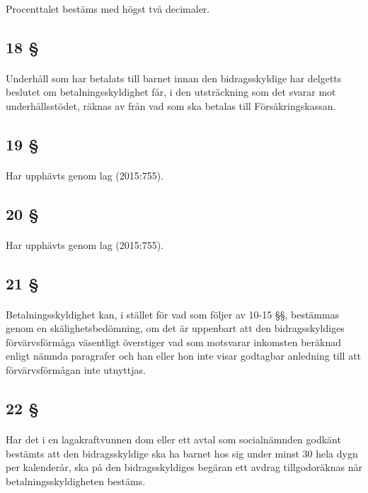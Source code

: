\documentclass[a4paper,notitlepage,openany,10pt]{book}
\begin{document}
\paragraph*{}
Procenttalet bestäms med högst två decimaler.
\subsection*{18 §}
\paragraph*{}
Underhåll som har betalats till barnet innan den bidragsskyldige har delgetts beslutet om betalningsskyldighet får, i den utsträckning som det svarar mot underhållsstödet, räknas av från vad som ska betalas till Försäkringskassan.
\subsection*{19 §}
\paragraph*{}
Har upphävts genom
lag (2015:755).
\subsection*{20 §}
\paragraph*{}
Har upphävts genom
lag (2015:755).
\subsection*{21 §}
\paragraph*{}
Betalningsskyldighet kan, i stället för vad som följer av 10-15 §§, bestämmas genom en skälighetsbedömning, om det är uppenbart att den bidragsskyldiges förvärvsförmåga väsentligt överstiger vad som motsvarar inkomsten beräknad enligt nämnda paragrafer och han eller hon inte visar godtagbar anledning till att förvärvsförmågan inte utnyttjas.
\subsection*{22 §}
\paragraph*{}
Har det i en lagakraftvunnen dom eller ett avtal som socialnämnden godkänt bestämts att den bidragsskyldige ska ha barnet hos sig under minst 30 hela dygn per kalenderår, ska på den bidragsskyldiges begäran ett avdrag tillgodoräknas när betalningsskyldigheten bestäms.
\end{document}
